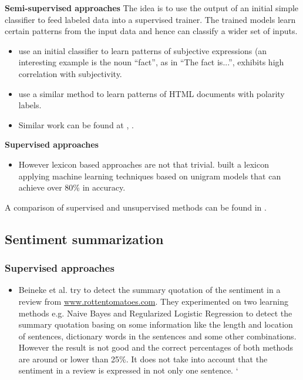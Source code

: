\documentclass{article}
\begin{document}
\begin{multicols}{2}
        \textbf{Semi-supervised approaches}
          The idea is to use the output of an initial simple classifier to feed
  labeled data into a supervised trainer. The trained models learn
  certain patterns from the input data and hence can classify a wider set of
  inputs.
          \begin{itemize}
            \item \cite{Riloff2003} use an initial classifier to learn patterns
  of subjective expressions (an interesting example is the noun ``fact'', as in
  ``The fact is...'', exhibits high correlation with subjectivity.
            \item \cite{Kaji2006} use a similar method to learn patterns of HTML
  documents with polarity labels.
            \item Similar work can be found at
  \cite{Wiebea2005}, \cite{Riloff2003a}.
          \end{itemize}

        \textbf{Supervised approaches}
          \begin{itemize}
              \item However lexicon based approaches are not that trivial.
  \citet{Pang2002} built a lexicon applying machine learning techniques based on
  unigram models that can achieve over 80\% in accuracy.
          \end{itemize}

        A comparison of supervised and unsupervised methods can be found in
  \cite{Chaovalit2005}.

  \subsection{Sentiment summarization}
    \subsubsection{Supervised approaches}
        \begin{itemize}
            \item Beineke et al. \citet{Beineke2004} try to detect
the summary quotation of the sentiment in a review
from \url{www.rottentomatoes.com}. They experimented on two learning methods
e.g. Naive Bayes and Regularized Logistic Regression to detect the summary
quotation basing on some information like the length and location of sentences,
dictionary words in the sentences and some other combinations. However the
result is not good and the correct percentages of both methods are around or
lower than 25\%. It does not take into account that the sentiment in a review is
expressed in not only one sentence.         
  `     \end{itemize}   


\end{multicols}
\end{document}
